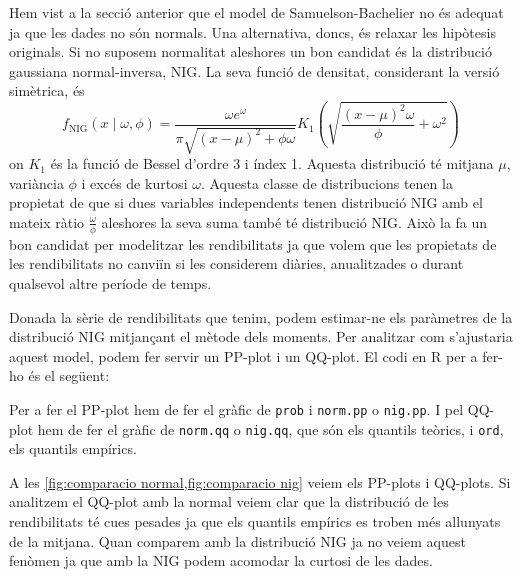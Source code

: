 \documentclass{article}
\numberwithin{table}{section}
\numberwithin{figure}{section}
\numberwithin{equation}{section}
\begin{document}
Hem vist a la secció anterior que el model de Samuelson-Bachelier no és adequat ja que les dades no són normals. Una alternativa, doncs, és relaxar les hipòtesis originals. Si no suposem normalitat aleshores un bon candidat és la distribució gaussiana normal-inversa, NIG. La seva funció de densitat, considerant la versió simètrica, és
\begin{equation*}
	f_{\text{NIG}}(x \mid \omega, \phi) = \frac{\omega e^{\omega}}{\pi \sqrt{(x - \mu)^2 + \phi \omega}} K_1 \left(\sqrt{\frac{(x - \mu)^2 \omega}{\phi} + \omega^2}\right) 
\end{equation*}
on \( K_1 \) és la funció de Bessel d'ordre 3 i índex 1. Aquesta distribució té mitjana \( \mu \), variància \( \phi \) i excés de kurtosi \( \omega \). Aquesta classe de distribucions tenen la propietat de que si dues variables independents tenen distribució NIG amb el mateix ràtio \( \frac{\omega}{\phi} \) aleshores la seva suma també té distribució NIG. Això la fa un bon candidat per modelitzar les rendibilitats ja que volem que les propietats de les rendibilitats no canviïn si les considerem diàries, anualitzades o durant qualsevol altre període de temps. 

Donada la sèrie de rendibilitats que tenim, podem estimar-ne els paràmetres de la distribució NIG mitjançant el mètode dels moments. Per analitzar com s'ajustaria aquest model, podem fer servir un PP-plot i un QQ-plot. El codi en \textsf{R} per a fer-ho és el següent:  

Per a fer el PP-plot hem de fer el gràfic de \texttt{prob} i \texttt{norm.pp} o \texttt{nig.pp}. I pel QQ-plot hem de fer el gràfic de \texttt{norm.qq} o \texttt{nig.qq}, que són els quantils teòrics, i \texttt{ord}, els quantils empírics. 

A les \cref{fig:comparacio normal,fig:comparacio nig} veiem els PP-plots i QQ-plots. Si analitzem el QQ-plot amb la normal veiem clar que la distribució de les rendibilitats té cues pesades ja que els quantils empírics es troben més allunyats de la mitjana. Quan comparem amb la distribució NIG ja no veiem aquest fenòmen ja que amb la NIG podem acomodar la curtosi de les dades.
\end{document}
